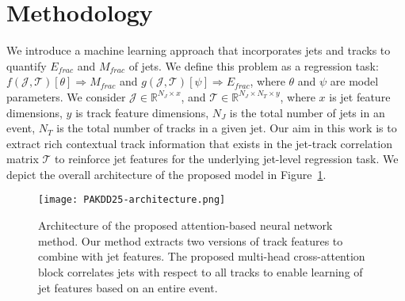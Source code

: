 \section{Methodology}\hfill

We introduce a machine learning approach \myname{} that incorporates jets and tracks to quantify $E_{frac}$ and $M_{frac}$ of jets. We define this problem as a regression task: $f(\mathcal{J},\mathcal{T})[\theta] \Rightarrow M_{frac}$ and $g(\mathcal{J},\mathcal{T})[\psi] \Rightarrow E_{frac}$, where $\theta$ and $\psi$ are model parameters. We consider $\mathcal{J} \in \mathbb{R}^{N_J \times x}$, and $\mathcal{T} \in \mathbb{R}^{N_J \times N_T \times y}$, where $x$ is jet feature dimensions, $y$ is track feature dimensions, $N_J$ is the total number of jets in an event, $N_T$ is the total number of tracks in a given jet. Our aim in this work is to extract rich contextual track information that exists in the jet-track correlation matrix $\mathcal{T}$ to reinforce jet features for the underlying jet-level regression task. We depict the overall architecture of the proposed model in Figure~\ref{fig:Model}.

\begin{figure}[t]
\centering
  \texttt{[image: PAKDD25-architecture.png]}
\caption{Architecture of the proposed attention-based neural network method. Our method extracts two versions of track features to combine with jet features. The proposed multi-head cross-attention block correlates jets with respect to all tracks to enable learning of jet features based on an entire event.}
\label{fig:Model}
\end{figure}




